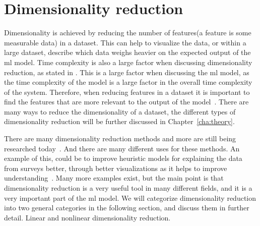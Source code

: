

\section{Dimensionality reduction}\label{sec:dimensionality-reduction-problem}
Dimensionality is achieved by reducing the number of features(a feature is some measurable data) in a dataset. This can help to visualize the data, or within a large dataset, describe which data weighs heavier on the expected output of the \gls{ml} model. Time complexity is also a large factor when discussing dimensionality reduction, as stated in . This is a large factor when discussing the \gls{ml} model, as the time complexity of the model is a large factor in the overall time complexity of the system. Therefore, when reducing features in a dataset it is important to find the features that are more relevant to the output of the model~\cite{Feature-engineering-zheng}. There are many ways to reduce the dimensionality of a dataset, the different types of dimensionality reduction will be further discussed in Chapter~\ref{cha:theory}.

There are many dimensionality reduction methods and more are still being researched today~\cite{dimensionality-reduction-cheng}. And there are many different uses for these methods. An example of this, could be to improve heuristic models for explaining the data from surveys better, through better visualizations as it helps to improve understanding~\cite{dimensionality-reduction-cheng}. Many more examples exist, but the main point is that dimensionality reduction is a very useful tool in many different fields, and it is a very important part of the \gls{ml} model. We will categorize dimensionality reduction into two general categories in the following section, and discuss them in further detail. Linear and nonlinear dimensionality reduction.

